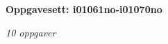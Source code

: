 \centerline{\bf Oppgavesett: i01061no-i01070no}
\vskip 10pt
\centerline{\it 10 oppgaver}\vskip 10pt
\vskip 10pt
